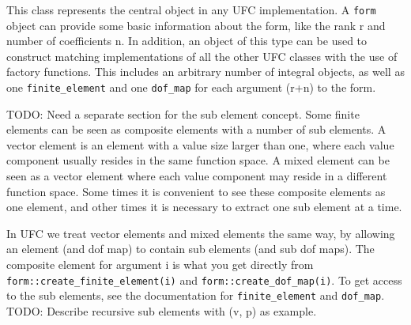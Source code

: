 This class represents the central object in any UFC implementation.
A \texttt{form} object can provide some basic information about the form,
like the rank r and number of coefficients n.
In addition, an object of this type can be used to construct matching
implementations of all the other UFC classes with the use of factory functions.
This includes an arbitrary number of integral objects,
as well as one \texttt{finite\_element} and one \texttt{dof\_map} for
each argument (r+n) to the form.

TODO: Need a separate section for the sub element concept.
Some finite elements can be seen as composite elements with a number of sub elements.
A vector element is an element with a value size larger than one,
where each value component usually resides in the same function space.
A mixed element can be seen as a vector element where each value
component may reside in a different function space.
Some times it is convenient to see these composite elements as one element,
and other times it is necessary to extract one sub element at a time.

In UFC we treat vector elements and mixed elements the same way, by allowing
an element (and dof map) to contain sub elements (and sub dof maps).
The composite element for argument i is what you get directly from
\texttt{form::create\_finite\_element(i)} and \texttt{form::create\_dof\_map(i)}.
To get access to the sub elements, see the documentation for
\texttt{finite\_element} and \texttt{dof\_map}.
TODO: Describe recursive sub elements with (v, p) as example.






